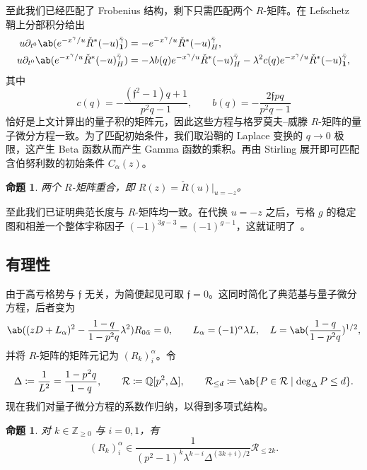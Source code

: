 \documentclass{amsart}
\newtheorem{prop}[thm]{命题}
\theoremstyle{definition}
\theoremstyle{remark}
\theoremstyle{plain}
\theoremstyle{definition}
\theoremstyle{remark}
\newcommand{\Z}{\mathbb{Z}}
\newcommand{\Q}{\mathbb{Q}}
\newcommand{\mc}[1]{\mathcal{#1}}
\newcommand{\mf}[1]{\mathfrak{#1}}
\newcommand{\1}{\mathbf{1}}
\newcommand{\2}{\mathbf{2}}
\newcommand{\3}{\mathbf{3}}
\begin{document}
至此我们已经匹配了 Frobenius 结构，剩下只需匹配两个 \(R\)-矩阵。在 Lefschetz 鞘上分部积分给出
\begin{align*}
    u \partial_{t^0}\ab(e^{-x^{\gamma}/u}\check{R}^*(-u)^{\bar{\gamma}}_{\1}) &= -e^{-x^{\gamma}/u}\check{R}^*(-u)^{\bar{\gamma}}_H, \\
    u\partial_{t^0}\ab(e^{-x^{\gamma}/u}\check{R}^*(-u)^{\bar{\gamma}}_H) &= -\lambda b(q)e^{-x^{\gamma}/u}\check{R}^*(-u)^{\bar{\gamma}}_H - \lambda^2 c(q) e^{-x^{\gamma}/u}\check{R}^*(-u)^{\bar{\gamma}}_{\1},
\end{align*}
其中
\[ c(q) = -\frac{(\mf{f}^2-1)q+1}{p^2q-1}, \qquad b(q) = -\frac{2\mf{f}pq}{p^2q-1} \]
恰好是上文计算出的量子积的矩阵元，因此这些方程与格罗莫夫–威滕 \(R\)-矩阵的量子微分方程一致。为了匹配初始条件，我们取沿鞘的 Laplace 变换的 \(q \to 0\) 极限，这产生 Beta 函数从而产生 Gamma 函数的乘积。再由 Stirling 展开即可匹配含伯努利数的初始条件 \(C_{\alpha}(z)\)。

\begin{prop}%
\label{prop:R matrices coincide}
    两个 \(R\)-矩阵重合，即 \(R(z) = \check{R}(u)|_{u=-z}\)。
\end{prop}

至此我们已证明典范长度与 \(R\)-矩阵均一致。在代换 \(u = -z\) 之后，亏格 \(g\) 的稳定图和相差一个整体宇称因子 \((-1)^{3g-3} = (-1)^{g-1}\)，这就证明了~。

\subsection{有理性}%
\label{sub:Rationality}

由于高亏格势与 \(\mf{f}\) 无关，为简便起见可取 \(\mf{f} = 0\)。这同时简化了典范基与量子微分方程，后者变为
\[ \ab((zD+L_{\alpha})^2 - \frac{1-q}{1-p^2q}\lambda^2)R_{0\bar{\alpha}} = 0, \qquad L_{\alpha} = (-1)^{\alpha}\lambda L, \quad L = \ab(\frac{1-q}{1-p^2q})^{1/2}, \]
并将 \(R\)-矩阵的矩阵元记为 \((R_k)_i^{\alpha}\)。令
\[ \Delta \coloneqq \frac{1}{L^2} = \frac{1-p^2q}{1-q}, \qquad \mc{R} \coloneqq \Q[p^2,\Delta], \qquad \mc{R}_{\leq d} \coloneqq \ab\{P \in \mc{R} \mid \deg_{\Delta} P \leq d\}. \]
现在我们对量子微分方程的系数作归纳，以得到多项式结构。

\begin{prop}%
\label{prop:R matrix polynomiality}
    对 \(k \in \Z_{\geq0}\) 与 \(i = 0,1\)，有
    \[ (R_k)_i^{\alpha} \in \frac{1}{(p^2-1)^k \lambda^{k-i}\Delta^{(3k+i)/2}}\mc{R}_{\leq 2k}. \]
\end{prop}
\end{document}
